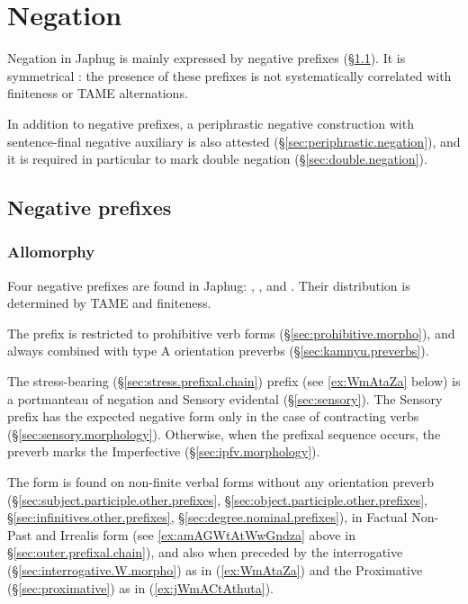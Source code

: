 \chapter{Negation} \label{chap:negation}
Negation in Japhug is mainly expressed by negative prefixes (§\ref{sec:negation}). It is symmetrical \citep{miestamo05negation}: the presence of these prefixes is not systematically correlated with finiteness or TAME alternations.

In addition to negative prefixes, a periphrastic negative construction with sentence-final negative auxiliary is also attested (§\ref{sec:periphrastic.negation}), and it is required in particular to mark double negation (§\ref{sec:double.negation}).




\section{Negative prefixes} \label{sec:negation}

\subsection{Allomorphy} \label{sec:neg.allomorphs}
Four negative prefixes are found in Japhug: , ,  and . Their distribution is determined by TAME and finiteness.

The  prefix is restricted to prohibitive verb forms (§\ref{sec:prohibitive.morpho}), and always combined with type A orientation preverbs (§\ref{sec:kamnyu.preverbs}). 

The stress-bearing (§\ref{sec:stress.prefixal.chain})  prefix (see \ref{ex:WmAtaZa} below) is a portmanteau of negation and Sensory evidental (§\ref{sec:sensory}). The Sensory prefix  has the expected negative form  only in the case of contracting verbs (§\ref{sec:sensory.morphology}). Otherwise, when the  prefixal sequence  occurs, the  preverb marks the Imperfective (§\ref{sec:ipfv.morphology}).

The form  is found on non-finite verbal forms without any orientation preverb (§\ref{sec:subject.participle.other.prefixes}, §\ref{sec:object.participle.other.prefixes}, §\ref{sec:infinitives.other.prefixes}, §\ref{sec:degree.nominal.prefixes}), in Factual Non-Past and Irrealis form (see \ref{ex:amAGWtAtWwGndza} above in §\ref{sec:outer.prefixal.chain}), and also when preceded by the interrogative  (§\ref{sec:interrogative.W.morpho}) as in (\ref{ex:WmAtaZa}) and the Proximative  (§\ref{sec:proximative}) as in  (\ref{ex:jWmACtAthuta}).


